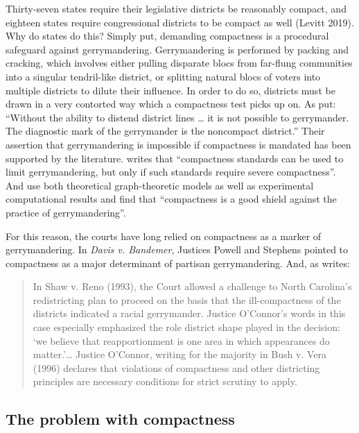 \documentclass[]{article}
\begin{document}
Thirty-seven states require their legislative districts be reasonably
compact, and eighteen states require congressional districts to be
compact as well (Levitt 2019). Why do states do this? Simply put,
demanding compactness is a procedural safeguard against gerrymandering.
Gerrymandering is performed by packing and cracking, which involves
either pulling disparate blocs from far-flung communities into a
singular tendril-like district, or splitting natural blocs of voters
into multiple districts to dilute their influence. In order to do so,
districts must be drawn in a very contorted way which a compactness test
picks up on. As \cite{pp1991} put: ``Without the ability to distend
district lines \ldots{} it is not possible to gerrymander. The
diagnostic mark of the gerrymander is the noncompact district.'' Their
assertion that gerrymandering is impossible if compactness is mandated
has been supported by the literature. \cite{altman1998} writes that
``compactness standards can be used to limit gerrymandering, but only if
such standards require severe compactness''. And \cite{apollonio2006}
use both theoretical graph-theoretic models as well as experimental
computational results and find that ``compactness is a good shield
against the practice of gerrymandering''.

For this reason, the courts have long relied on compactness as a marker
of gerrymandering. In \emph{Davis v. Bandemer}, Justices Powell and
Stephens pointed to compactness as a major determinant of partisan
gerrymandering. And, as \cite{altman1998} writes:

\begin{quote}
In Shaw v. Reno (1993), the Court allowed a challenge to North
Carolina's redistricting plan to proceed on the basis that the
ill-compactness of the districts indicated a racial gerrymander. Justice
O'Connor's words in this case especially emphasized the role district
shape played in the decision: `we believe that reapportionment is one
area in which appearances do matter.'\ldots{} Justice O'Connor, writing
for the majority in Bush v. Vera (1996) declares that violations of
compactness and other districting principles are necessary conditions
for strict scrutiny to apply.
\end{quote}

\hypertarget{the-problem-with-compactness}{%
\subsection{The problem with
compactness}\label{the-problem-with-compactness}}
\end{document}
